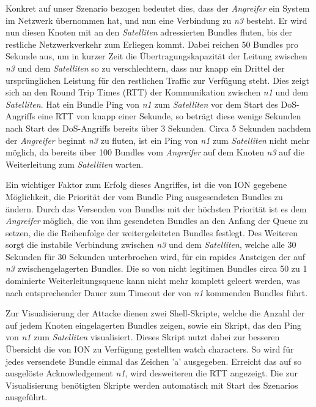 \documentclass{article}
\begin{document}
Konkret auf unser Szenario bezogen bedeutet dies, dass der \textit{Angreifer} ein System im Netzwerk übernommen hat, und nun eine Verbindung zu \textit{n3} besteht. Er wird nun diesen Knoten mit an den \textit{Satelliten} adressierten Bundles fluten, bis  der restliche Netzwerkverkehr zum Erliegen kommt. Dabei reichen 50 Bundles pro Sekunde aus, um in kurzer Zeit die Übertragungskapazität der Leitung zwischen \textit{n3} und dem \textit{Satelliten} so zu verschlechtern, dass nur knapp ein Drittel der ursprünglichen Leistung für den restlichen Traffic zur Verfügung steht. Dies zeigt sich an den Round Trip Times (RTT) der Kommunikation zwischen \textit{n1} und dem \textit{Satelliten}. Hat ein Bundle Ping von \textit{n1} zum \textit{Satelliten} vor dem Start des DoS-Angriffs eine RTT von knapp einer Sekunde, so beträgt diese wenige Sekunden nach Start des DoS-Angriffs bereits über 3 Sekunden. Circa 5 Sekunden nachdem der \textit{Angreifer} beginnt \textit{n3} zu fluten, ist ein Ping von \textit{n1} zum \textit{Satelliten} nicht mehr möglich, da bereits über 100 Bundles vom \textit{Angreifer} auf dem Knoten \textit{n3} auf die Weiterleitung zum \textit{Satelliten} warten.\par
Ein wichtiger Faktor zum Erfolg dieses Angriffes, ist die von ION gegebene Möglichkeit, die Priorität der vom Bundle Ping ausgesendeten Bundles zu ändern. Durch das Versenden von Bundles mit der höchsten Priorität ist es dem \textit{Angreifer} möglich, die von ihm gesendeten Bundles an den Anfang der Queue zu setzen, die die Reihenfolge der weitergeleiteten Bundles festlegt. Des Weiteren sorgt die instabile Verbindung zwischen \textit{n3} und dem \textit{Satelliten}, welche alle 30 Sekunden für 30 Sekunden unterbrochen wird, für ein rapides Ansteigen der auf \textit{n3} zwischengelagerten Bundles. Die so von nicht legitimen Bundles circa 50 zu 1 dominierte Weiterleitungsqueue kann nicht mehr komplett geleert werden, was nach entsprechender Dauer zum Timeout der von \textit{n1} kommenden Bundles führt. \par
Zur Visualisierung der Attacke dienen zwei Shell-Skripte, welche  die Anzahl der auf jedem Knoten eingelagerten Bundles zeigen, sowie ein Skript, das den Ping von \textit{n1} zum \textit{Satelliten} visualisiert. Dieses Skript nutzt dabei zur besseren Übersicht die von ION zu Verfügung gestellten watch characters. So wird für jedes versendete Bundle einmal das Zeichen 'a' ausgegeben. Erreicht das auf so ausgelöste Acknowledgement \textit{n1}, wird desweiteren die RTT angezeigt. Die zur Visualisierung benötigten Skripte werden automatisch mit Start des Szenarios ausgeführt.
\end{document}
